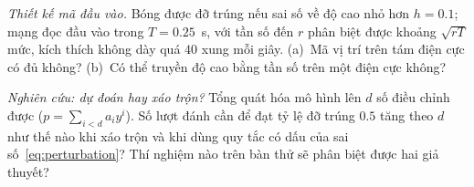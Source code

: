 \begin{exercise}[\lvlB]
\label{ex:22:6}
\emph{Thiết kế mã đầu vào.} Bóng được đỡ trúng nếu sai số về độ cao nhỏ hơn $h=0.1$; mạng đọc đầu vào trong $T=0.25$~s, với tần số đến $r$ phân biệt được khoảng $\sqrt{rT}$ mức, kích thích không dày quá $40$ xung mỗi giây. (a)~Mã vị trí trên tám điện cực có đủ không? (b)~Có thể truyền độ cao bằng tần số trên một điện cực không?
\end{exercise}

\begin{exercise}[\lvlC]
\label{ex:22:7}
\emph{Nghiên cứu: dự đoán hay xáo trộn?} Tổng quát hóa mô hình lên $d$ số điều chỉnh được ($p=\sum_{i<d}a_iy^i$). Số lượt đánh cần để đạt tỷ lệ đỡ trúng $0.5$ tăng theo $d$ như thế nào khi xáo trộn và khi dùng quy tắc có dấu của sai số~\eqref{eq:perturbation}? Thí nghiệm nào trên bàn thử sẽ phân biệt được hai giả thuyết?
\end{exercise}
